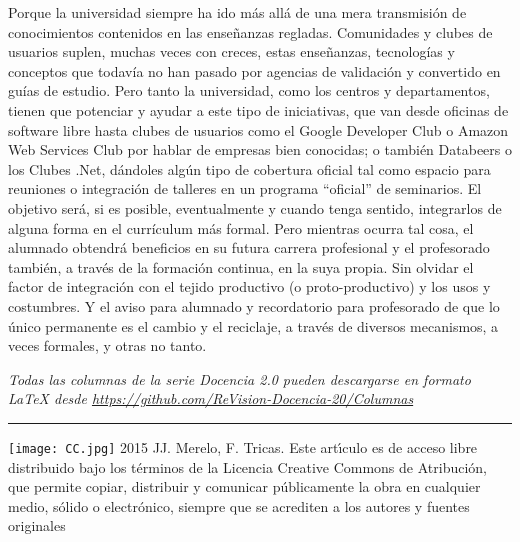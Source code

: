 \documentclass[twoside,10pt]{article}
\begin{document}
\begin{multicols}{2}
Porque la universidad siempre ha ido m\'as all\'a de una mera
transmisi\'on de conocimientos contenidos en las enseñanzas regladas. Comunidades y clubes de
usuarios suplen, muchas veces con creces, estas ense\~nanzas,
tecnolog\'ias y conceptos que todav\'ia no han pasado por agencias de
validaci\'on y convertido en gu\'ias de estudio. Pero tanto la
universidad, como los centros y  departamentos, tienen que
potenciar y ayudar a este tipo de iniciativas, que van desde oficinas
de software libre hasta clubes de usuarios como el Google Developer
Club o Amazon Web Services Club por hablar de empresas bien conocidas; o
tambi\'en Databeers o los Clubes .Net, 
d\'andoles alg\'un tipo de cobertura oficial tal como espacio
para reuniones o integración de talleres en un programa ``oficial'' de
seminarios. 
El objetivo será, si es posible, eventualmente y cuando tenga sentido, integrarlos de
alguna forma en el curr\'iculum m\'as formal. Pero mientras ocurra tal
cosa, el alumnado obtendr\'a
beneficios en su
futura carrera profesional y el profesorado tambi\'en, a trav\'es de la
formaci\'on continua, en la suya propia. 
Sin olvidar el factor de integraci\'on con el tejido productivo (o
proto-productivo) y los usos y costumbres. Y el aviso para alumnado y
recordatorio para profesorado de que lo \'unico
permanente es el cambio y el reciclaje, a trav\'es de diversos mecanismos,
a veces formales, y otras no tanto.

\bigskip

\noindent\emph{Todas las columnas de la serie Docencia 2.0
pueden descargarse en formato LaTeX desde
{\small\url{https://github.com/ReVision-Docencia-20/Columnas}}}

\noindent\rule{90mm}{1pt}

{\small \noindent\texttt{[image: CC.jpg]} 2015 JJ. Merelo, F. Tricas. Este art\'{\i}culo es de acceso libre distribuido bajo los t\'erminos
de la Licencia Creative Commons de Atribuci\'on, que permite copiar,
distribuir y comunicar p\'ublicamente la obra en cualquier medio, s\'olido
o electr\'onico, siempre que se acrediten a los autores y fuentes
originales}

\end{multicols}
\end{document}
